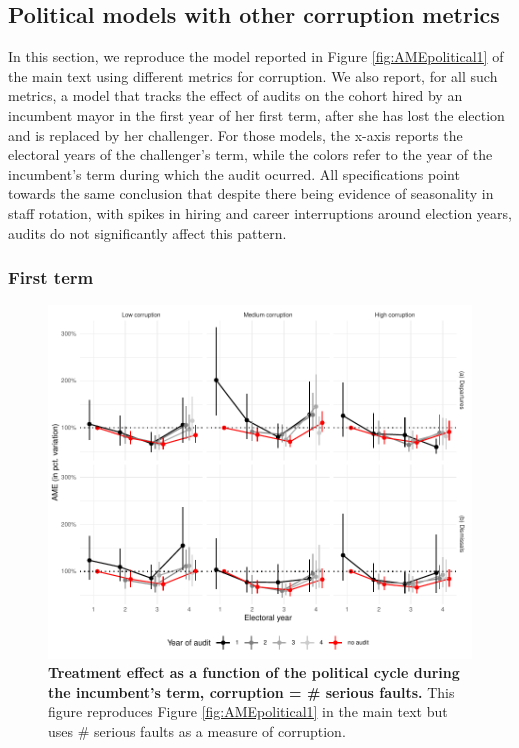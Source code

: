 {\subsection{Political models with other corruption metrics}
\label{app:political}

In this section, we reproduce the model reported in Figure \ref{fig:AMEpolitical1} of the main text using different metrics for corruption. We also report, for all such metrics, a model that tracks the effect of audits on the cohort hired by an incumbent mayor in the first year of her first term, after she has lost the election and is replaced by her challenger. For those models, the x-axis reports the electoral years of the challenger's term, while the colors refer to the year of the incumbent's term during which the audit ocurred. All specifications point towards the same conclusion that despite there being evidence of seasonality in staff rotation, with spikes in hiring and career interruptions around election years, audits do not significantly affect this pattern. 

\subsubsection*{First term}

 \begin{figure}[H]
     \centering
     \includegraphics{chapters/chapter_2/figures/AMEpoliticalSerious_term1Client.pdf}
     \caption{{\bf Treatment effect as a function of the political cycle during the incumbent's term, corruption = \# serious faults.} This figure reproduces Figure \ref{fig:AMEpolitical1} in the main text but uses \# serious faults as a measure of corruption.}
     \label{fig:AMEpolitical1_serious}
 \end{figure}

}
